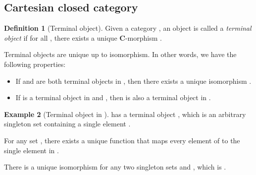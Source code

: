 \documentclass[12pt,a4paper]{report}
\theoremstyle{definition}
\newtheorem{definition}{Definition}[chapter]
\newtheorem{example}[definition]{Example}
\begin{document}
        \subsection{Cartesian closed category}
            \begin{definition}[Terminal object]
                Given a category , an object  is called a \emph{terminal object} if for all , there exists a unique \textbf{C}-morphism .
            \end{definition}
            Terminal objects are unique up to isomorphism. In other words, we have the following properties:
            \begin{itemize}
                \item 
                    If  and  are both terminal objects in , then there exists a unique isomorphism .
                \item
                    If  is a terminal object in  and , then  is also a terminal object in .
            \end{itemize}
            \begin{example}[Terminal object in ]
                 has a terminal object \text{\{\ast\}}, which is an arbitrary singleton set containing a single element \text{\ast}.

                For any set , there exists a unique function  that maps every element of  to the single element \text{\ast} in \text{\{\ast\}}.
                
                There is a unique isomorphism  for any two singleton sets \text{\{\ast\}} and \text{\{\cdot\}}, which is .
            \end{example}
\end{document}
